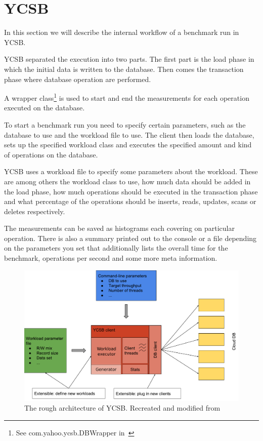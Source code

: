 \section{YCSB}
In this section we will describe the internal workflow of a benchmark run in YCSB.

YCSB separated the execution into two parts.
The first part is the load phase in which the initial data is written to the database.
Then comes the transaction phase where database operation are performed.

A wrapper class\footnote{See com.yahoo.ycsb.DBWrapper in~\cite{Cooper}} is used to start and end the measurements for each operation executed on the database.

To start a benchmark run you need to specify certain parameters,
such as the database to use and the workload file to use.
The client then loads the database,
sets up the specified workload class and executes the specified amount and kind of operations on the database.

YCSB uses a workload file to specify some parameters about the workload.
These are among others the workload class to use,
how much data should be added in the load phase,
how much operations should be executed in the transaction phase and what percentage of the operations should be inserts, reads, updates, scans or deletes respectively.

The measurements can be saved as histograms each covering on particular operation.
There is also a summary printed out to the console or a file depending on the parameters you set that additionally lists the overall time for the benchmark, operations per second and some more meta information.

\begin{figure}
  \centering
  \includegraphics[width=\textwidth]{images/ycsbArchitecture}
  \caption{The rough architecture of YCSB. Recreated and modified from~\cite[25]{Abubakar2014}}
  \label{fig:ycsbArchitecture}
\end{figure}

